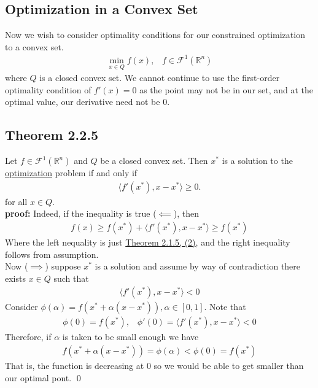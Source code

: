 \documentclass[12pt,a4paper]{article}
\begin{document}
	\subsection*{Optimization in a Convex Set}\label{optconv}
	Now we wish to consider optimality conditions for our constrained optimization to a convex set. 
	\begin{align*}
		\min_{x \in Q}f(x), \hspace{10pt} f \in \mathcal{F}^1(\mathbb{R}^n)
	\end{align*}
	where $Q$ is a closed convex set. We cannot continue to use the first-order optimality condition of $f'(x) = 0$ as the point may not be in our set, and at the optimal value, our derivative need not be $0$.
	
	\subsection*{Theorem 2.2.5}\label{thm225}
	Let $f \in \mathcal{F}^1(\mathbb{R}^n)$ and $Q$ be a closed convex set. Then $x^*$ is a solution to the  \hyperref[optconv]{optimization} problem if and only if
	\begin{align*}
		\langle f'(x^*), x - x^* \rangle \geq 0. 
	\end{align*}
	for all $x \in Q$. \\
	\textbf{proof:} Indeed, if the inequality is true ($\impliedby$), then
	\begin{align*}
		f(x) \geq f(x^*) + \langle f'(x^*), x - x^* \rangle \geq f(x^*)
	\end{align*}
	Where the left nequality is just \hyperref[thm215]{Theorem 2.1.5, (2)}, and the right inequality follows from assumption. \\
	Now ($\implies$) suppose $x^*$ is a solution and assume by way of contradiction there exists $x \in Q$ such that 
	\begin{align*}
		\langle f'(x^*), x - x^* \rangle < 0 
	\end{align*}
	Consider $\phi(\alpha) = f(x^* + \alpha(x - x^*)), \alpha \in [0,1]$. Note that
	\begin{align}
		\phi(0) = f(x^*), \hspace{10pt} \phi'(0) = \langle f'(x^*), x - x^* \rangle < 0
	\end{align}
	Therefore, if $\alpha$ is taken to be small enough we have
	\begin{align*}
		f(x^* + \alpha(x - x^*)) = \phi(\alpha)< \phi(0) = f(x^*)
	\end{align*} 
	That is, the function is decreasing at $0$ so we would be able to get smaller than our optimal pont.
	\qed
\end{document}
